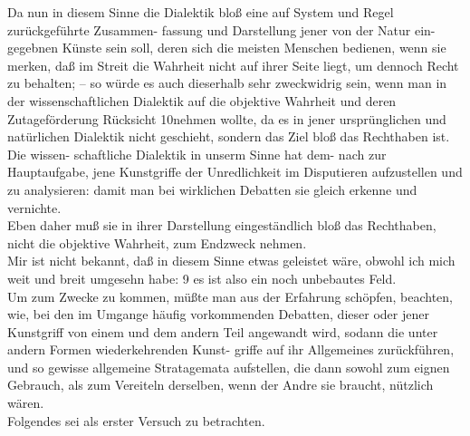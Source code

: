 \documentclass{book}
\newcommand{\de}[1]{{\color{red}#1}\\}
\begin{document}
\de{Da nun in diesem Sinne die Dialektik bloß eine
auf System und Regel zurückgeführte Zusammen-
fassung und Darstellung jener von der Natur ein-
gegebnen Künste sein soll, deren sich die meisten
Menschen bedienen, wenn sie merken, daß im
Streit die Wahrheit nicht auf ihrer Seite liegt, um
dennoch Recht zu behalten; – so würde es auch
dieserhalb sehr zweckwidrig sein, wenn man in
der wissenschaftlichen Dialektik auf die objektive
Wahrheit und deren Zutageförderung Rücksicht
10nehmen wollte, da es in jener ursprünglichen und
natürlichen Dialektik nicht geschieht, sondern
das Ziel bloß das Rechthaben ist.}
\de{Die wissen-
schaftliche Dialektik in unserm Sinne hat dem-
nach zur Hauptaufgabe, jene Kunstgriffe der
Unredlichkeit im Disputieren aufzustellen und zu
analysieren: damit man bei wirklichen Debatten
sie gleich erkenne und vernichte.}
\de{Eben daher muß
sie in ihrer Darstellung eingeständlich bloß das
Rechthaben, nicht die objektive Wahrheit, zum
Endzweck nehmen.}


\de{Mir ist nicht bekannt, daß in diesem Sinne
etwas geleistet wäre, obwohl ich mich weit und
breit umgesehn habe: 9 es ist also ein noch
unbebautes Feld.}
\de{Um zum Zwecke zu kommen,
müßte man aus der Erfahrung schöpfen, beachten,
wie, bei den im Umgange häufig vorkommenden
Debatten, dieser oder jener Kunstgriff von einem
und dem andern Teil angewandt wird, sodann die
unter andern Formen wiederkehrenden Kunst-
griffe auf ihr Allgemeines zurückführen, und so
gewisse allgemeine Stratagemata aufstellen, die
dann sowohl zum eignen Gebrauch, als zum
Vereiteln derselben, wenn der Andre sie braucht,
nützlich wären.}


\de{Folgendes sei als erster Versuch zu betrachten.}
\end{document}
